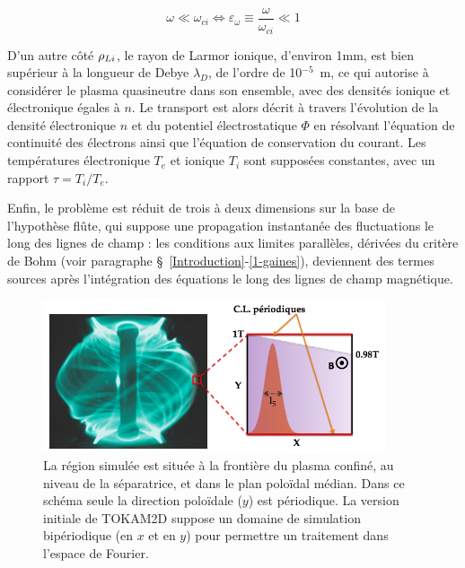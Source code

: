 \begin{refsection}
\begin{equation}
\omega\ll\omega_{ci}\Leftrightarrow
\varepsilon_\omega\equiv\frac{\omega}{\omega_{ci}}\ll 1
\end{equation}

D'un autre côté $\rho{_{Li}}$, le rayon de Larmor ionique, d'environ
1mm, est bien supérieur à la longueur de
Debye $\lambda_D$, de l'ordre de 10$^{-5}$~m, ce qui autorise à
considérer le plasma quasineutre dans son ensemble, avec des densités ionique
et électronique égales à $n$.
Le transport est alors décrit à travers l'évolution de la densité
électronique $n$ et du potentiel électrostatique $\Phi$ en résolvant l'équation
de continuité des électrons ainsi que l'équation de conservation du courant. Les
températures électronique
$T_e$ et ionique $T_i$ sont supposées constantes, avec un rapport $\tau=T_i/T_e$.

Enfin, le problème est réduit de trois à deux dimensions sur la base de l'hypothèse
flûte, qui suppose une propagation instantanée des fluctuations le long des
lignes de champ : les conditions aux limites parallèles, dérivées du critère de
Bohm (voir paragraphe
\S~\ref{Introduction}-\ref{1-gaines}), deviennent des termes sources après
l'intégration des équations le long des lignes de champ magnétique.

\begin{figure}[!htbp]
\centering
    \includegraphics[width=0.9\textwidth]{figures/2-tokamSimDomain.png}
    \caption{La région simulée est située à la frontière du plasma confiné,
    au niveau de la séparatrice, et dans le plan poloïdal médian. Dans ce
    schéma seule la direction poloïdale ($y$) est périodique. La version
    initiale de TOKAM2D suppose un domaine de simulation
    bipériodique (en $x$ et en $y$) pour permettre un traitement dans l'espace de Fourier.}
    \label{2-figTokamGeom}
\end{figure}


\end{refsection}
